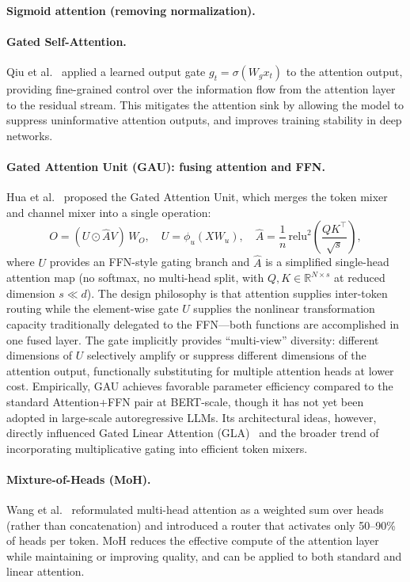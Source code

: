 \paragraph{Sigmoid attention (removing normalization).}
\paragraph{Gated Self-Attention.}
Qiu et al.~\cite{qiu2025gated} applied a learned output gate $g_t = \sigma(W_g x_t)$ to the attention output, providing fine-grained control over the information flow from the attention layer to the residual stream. This mitigates the attention sink by allowing the model to suppress uninformative attention outputs, and improves training stability in deep networks.

\paragraph{Gated Attention Unit (GAU): fusing attention and FFN.}
Hua et al.~\cite{hua2022transformer} proposed the Gated Attention Unit, which merges the token mixer and channel mixer into a single operation:
\begin{equation}
O = (U \odot \hat{A} V)\, W_O, \quad U = \phi_u(X W_u), \quad \hat{A} = \frac{1}{n}\,\mathrm{relu}^2\!\left(\frac{QK^\top}{\sqrt{s}}\right),
\end{equation}
where $U$ provides an FFN-style gating branch and $\hat{A}$ is a simplified single-head attention map (no softmax, no multi-head split, with $Q, K \in \mathbb{R}^{N \times s}$ at reduced dimension $s \ll d$). The design philosophy is that attention supplies inter-token routing while the element-wise gate $U$ supplies the nonlinear transformation capacity traditionally delegated to the FFN---both functions are accomplished in one fused layer. The gate implicitly provides ``multi-view'' diversity: different dimensions of $U$ selectively amplify or suppress different dimensions of the attention output, functionally substituting for multiple attention heads at lower cost. Empirically, GAU achieves favorable parameter efficiency compared to the standard Attention+FFN pair at BERT-scale, though it has not yet been adopted in large-scale autoregressive LLMs. Its architectural ideas, however, directly influenced Gated Linear Attention (GLA)~\cite{yang2024gla} and the broader trend of incorporating multiplicative gating into efficient token mixers.

\paragraph{Mixture-of-Heads (MoH).}
Wang et al.~\cite{wang2024moh} reformulated multi-head attention as a weighted sum over heads (rather than concatenation) and introduced a router that activates only 50--90\% of heads per token. MoH reduces the effective compute of the attention layer while maintaining or improving quality, and can be applied to both standard and linear attention.



